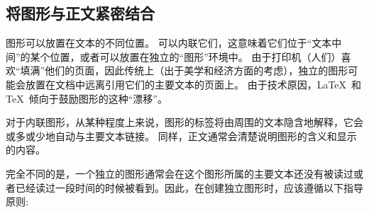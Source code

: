 \subsection{将图形与正文紧密结合}


图形可以放置在文本的不同位置。 可以内联它们，这意味着它们位于``文本中间''的某个位置，或者可以放置在独立的``图形''环境中。 由于打印机（人们）喜欢``填满''他们的页面，因此传统上（出于美学和经济方面的考虑），独立的图形可能会放置在文档中远离引用它们的主要文本的页面上。 由于技术原因，\LaTeX\ 和\TeX\ 倾向于鼓励图形的这种``漂移''。


对于内联图形，从某种程度上来说，图形的标签将由周围的文本隐含地解释，它会或多或少地自动与主要文本链接。 同样，正文通常会清楚说明图形的含义和显示的内容。


完全不同的是，一个独立的图形通常会在这个图形所属的主要文本还没有被读过或者已经读过一段时间的时候被看到。因此，在创建独立图形时，应该遵循以下指导原则:

